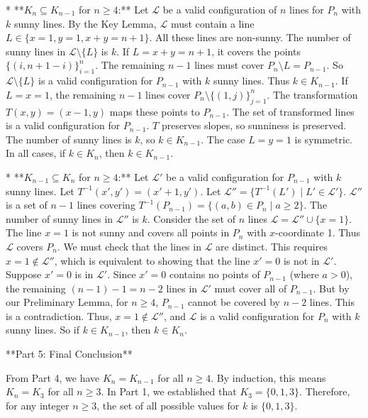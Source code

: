 *   **$K_n \subseteq K_{n-1}$ for $n \ge 4$:**
    Let $\mathcal{L}$ be a valid configuration of $n$ lines for $P_n$ with $k$ sunny lines. By the Key Lemma, $\mathcal{L}$ must contain a line $L \in \{x=1, y=1, x+y=n+1\}$. All these lines are non-sunny. The number of sunny lines in $\mathcal{L} \setminus \{L\}$ is $k$.
    If $L=x+y=n+1$, it covers the points $\{(i, n+1-i)\}_{i=1}^n$. The remaining $n-1$ lines must cover $P_n \setminus L = P_{n-1}$. So $\mathcal{L} \setminus \{L\}$ is a valid configuration for $P_{n-1}$ with $k$ sunny lines. Thus $k \in K_{n-1}$.
    If $L=x=1$, the remaining $n-1$ lines cover $P_n \setminus \{(1,j)\}_{j=1}^n$. The transformation $T(x,y)=(x-1,y)$ maps these points to $P_{n-1}$. The set of transformed lines is a valid configuration for $P_{n-1}$. $T$ preserves slopes, so sunniness is preserved. The number of sunny lines is $k$, so $k \in K_{n-1}$. The case $L=y=1$ is symmetric.
    In all cases, if $k \in K_n$, then $k \in K_{n-1}$.

*   **$K_{n-1} \subseteq K_n$ for $n \ge 4$:**
    Let $\mathcal{L}'$ be a valid configuration for $P_{n-1}$ with $k$ sunny lines. Let $T^{-1}(x',y')=(x'+1, y')$. Let $\mathcal{L}'' = \{T^{-1}(L') \mid L' \in \mathcal{L}'\}$. $\mathcal{L}''$ is a set of $n-1$ lines covering $T^{-1}(P_{n-1}) = \{(a,b) \in P_n \mid a \ge 2\}$. The number of sunny lines in $\mathcal{L}''$ is $k$.
    Consider the set of $n$ lines $\mathcal{L} = \mathcal{L}'' \cup \{x=1\}$. The line $x=1$ is not sunny and covers all points in $P_n$ with $x$-coordinate 1. Thus $\mathcal{L}$ covers $P_n$.
    We must check that the lines in $\mathcal{L}$ are distinct. This requires $x=1 \notin \mathcal{L}''$, which is equivalent to showing that the line $x'=0$ is not in $\mathcal{L}'$. Suppose $x'=0$ is in $\mathcal{L}'$. Since $x'=0$ contains no points of $P_{n-1}$ (where $a>0$), the remaining $(n-1)-1=n-2$ lines in $\mathcal{L}'$ must cover all of $P_{n-1}$. But by our Preliminary Lemma, for $n \ge 4$, $P_{n-1}$ cannot be covered by $n-2$ lines. This is a contradiction.
    Thus, $x=1 \notin \mathcal{L}''$, and $\mathcal{L}$ is a valid configuration for $P_n$ with $k$ sunny lines. So if $k \in K_{n-1}$, then $k \in K_n$.

**Part 5: Final Conclusion**

From Part 4, we have $K_n = K_{n-1}$ for all $n \ge 4$. By induction, this means $K_n = K_3$ for all $n \ge 3$.
In Part 1, we established that $K_3 = \{0, 1, 3\}$.
Therefore, for any integer $n \ge 3$, the set of all possible values for $k$ is $\{0, 1, 3\}$.


